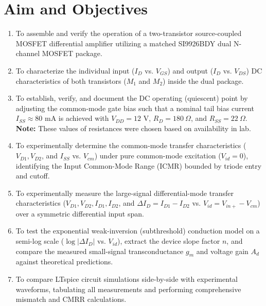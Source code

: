 \documentclass[11pt,a4paper]{article}
\begin{document}
\section{Aim and Objectives}
\begin{enumerate}
    \item To assemble and verify the operation of a two-transistor source-coupled MOSFET differential amplifier utilizing a matched SI9926BDY dual N-channel MOSFET package.
    \item To characterize the individual input ($I_D$ vs. $V_{GS}$) and output ($I_D$ vs. $V_{DS}$) DC characteristics of both transistors ($M_1$ and $M_2$) inside the dual package.
    \item To establish, verify, and document the DC operating (quiescent) point by adjusting the common-mode gate bias such that a nominal tail bias current $I_{SS} \approx 80\text{ mA}$ is achieved with $V_{DD} = 12\text{ V}$, $R_D = 180\ \Omega$, and $R_{SS} = 22\ \Omega$.\\\textbf{Note:} These values of resistances were chosen based on availability in lab.
    \item To experimentally determine the common-mode transfer characteristics ($V_{D1}, V_{D2}$, and $I_{SS}$ vs. $V_{cm}$) under pure common-mode excitation ($V_{id} = 0$), identifying the Input Common-Mode Range (ICMR) bounded by triode entry and cutoff.
    \item To experimentally measure the large-signal differential-mode transfer characteristics ($V_{D1}, V_{D2}, I_{D1}, I_{D2}$, and $\Delta I_D = I_{D1} - I_{D2}$ vs. $V_{id} = V_{in+} - V_{cm}$) over a symmetric differential input span.
    \item To test the exponential weak-inversion (subthreshold) conduction model on a semi-log scale ($\log |\Delta I_D|$ vs. $V_{id}$), extract the device slope factor $n$, and compare the measured small-signal transconductance $g_m$ and voltage gain $A_d$ against theoretical predictions.
    \item To compare LTspice circuit simulations side-by-side with experimental waveforms, tabulating all measurements and performing comprehensive mismatch and CMRR calculations.
\end{enumerate}
\end{document}
